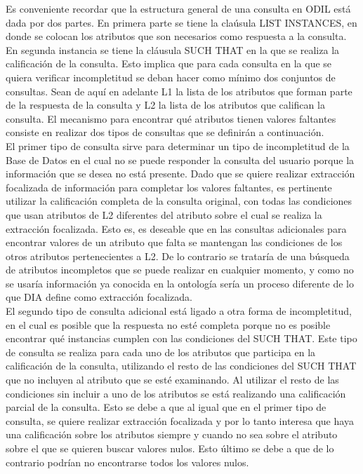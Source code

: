 Es conveniente recordar que la estructura general de una consulta en ODIL está dada por dos partes. En primera parte se tiene la claúsula LIST INSTANCES, en donde se colocan los atributos que son necesarios como respuesta a la consulta. En segunda instancia se tiene la cláusula SUCH THAT en la que se realiza la calificación de la consulta. Esto implica que para cada consulta en la que se quiera verificar incompletitud se deban hacer como mínimo dos conjuntos de consultas. Sean de aquí en adelante L1 la lista de los atributos que forman parte de la respuesta de la consulta y L2 la lista de los atributos que califican la consulta. El mecanismo para encontrar qué atributos tienen valores faltantes consiste en realizar dos tipos de consultas que se definirán a continuación. \\

El primer tipo de consulta sirve para determinar un tipo de incompletitud de la Base de Datos en el cual no se puede responder la consulta del usuario porque la información que se desea no está presente. Dado que se quiere realizar extracción focalizada de información para completar los valores faltantes, es pertinente utilizar la calificación completa de la consulta original, con todas las condiciones que usan atributos de L2 diferentes del atributo sobre el cual se realiza la extracción focalizada. Esto es, es deseable que en las consultas adicionales para encontrar valores de un atributo que falta se mantengan las condiciones de los otros atributos pertenecientes a L2. De lo contrario se trataría de una búsqueda de atributos incompletos que se puede realizar en cualquier momento, y como no se usaría información ya conocida en la ontología sería un proceso diferente de lo que DIA define como extracción focalizada. \\

El segundo tipo de consulta adicional está ligado a otra forma de incompletitud, en el cual es posible que la respuesta no esté completa porque no es posible encontrar qué instancias cumplen con las condiciones del SUCH THAT. Este tipo de consulta se realiza para cada uno de los atributos que participa en la calificación de la consulta, utilizando el resto de las condiciones del SUCH THAT que no incluyen al atributo que se esté examinando. Al utilizar el resto de las condiciones sin incluir a uno de los atributos se está realizando una calificación parcial de la consulta. Esto se debe a que al igual que en el primer tipo de consulta, se quiere realizar extracción focalizada y por lo tanto interesa que haya una calificación sobre los atributos siempre y cuando no sea sobre el atributo sobre el que se quieren buscar valores nulos. Esto último se debe a que de lo contrario podrían no encontrarse todos los valores nulos. \\


